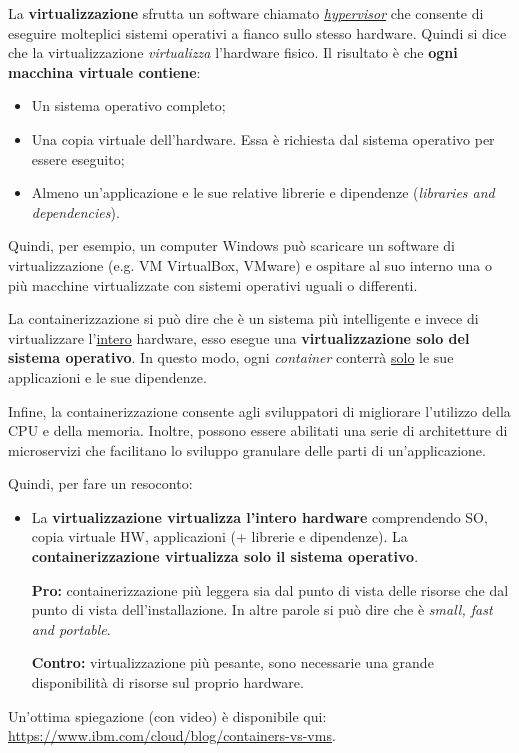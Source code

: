 \documentclass[a4paper]{article}
\begin{document}
	La \textbf{virtualizzazione} sfrutta un software chiamato \href{https://www.ibm.com/cloud/learn/hypervisors}{\emph{hypervisor}} che consente di eseguire molteplici sistemi operativi a fianco sullo stesso hardware. Quindi si dice che la virtualizzazione \emph{virtualizza} l'hardware fisico. Il risultato è che \textbf{ogni macchina virtuale contiene}:
	\begin{itemize}
		\item Un sistema operativo completo;
		\item Una copia virtuale dell'hardware. Essa è richiesta dal sistema operativo per essere eseguito;
		\item Almeno un'applicazione e le sue relative librerie e dipendenze (\emph{libraries and dependencies}).
	\end{itemize}
	Quindi, per esempio, un computer Windows può scaricare un software di virtualizzazione (e.g. VM VirtualBox, VMware) e ospitare al suo interno una o più macchine virtualizzate con sistemi operativi uguali o differenti.\newline
	
	\noindent
	La containerizzazione si può dire che è un sistema più intelligente e invece di virtualizzare l'\underline{intero} hardware, esso esegue una \textbf{virtualizzazione solo del sistema operativo}. In questo modo, ogni \emph{container} conterrà \underline{solo} le sue applicazioni e le sue dipendenze.
	
	Infine, la containerizzazione consente agli sviluppatori di migliorare l'utilizzo della CPU e della memoria. Inoltre, possono essere abilitati una serie di architetture di microservizi che facilitano lo sviluppo granulare delle parti di un'applicazione.\newline
	
	\noindent
	Quindi, per fare un resoconto:
	\begin{itemize}
		\item La \textbf{virtualizzazione virtualizza l'intero hardware} comprendendo SO, copia virtuale HW, applicazioni (+ librerie e dipendenze). La \textbf{containerizzazione virtualizza solo il sistema operativo}.
		
		\textcolor{Green4}{\textbf{Pro:}} containerizzazione più leggera sia dal punto di vista delle risorse che dal punto di vista dell'installazione. In altre parole si può dire che è \emph{small, fast and portable}.
		
		\textcolor{Red3}{\textbf{Contro:}} virtualizzazione più pesante, sono necessarie una grande disponibilità di risorse sul proprio hardware.
	\end{itemize}
	Un'ottima spiegazione (con video) è disponibile qui: \url{https://www.ibm.com/cloud/blog/containers-vs-vms}.\newpage
	
\end{document}
